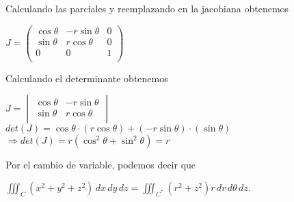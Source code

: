 \begin{center}
\end{center}Calculando las parciales y reemplazando en la jacobiana obtenemos\begin{center}
    $J = \begin{pmatrix}
        \cos\theta & -r\sin\theta & 0 \\
        \sin\theta & r\cos\theta & 0 \\
        0 & 0 & 1 \\
        \end{pmatrix}
    $
\end{center}Calculando el determinante obtenemos\begin{center}
    $J = 
        \begin{vmatrix}
        \cos\theta & -r\sin\theta \\
        \sin\theta & r\cos\theta \\
        \end{vmatrix}$\\
    \vspace{0.5cm}
    $det(J) = \cos\theta \cdot (r\cos\theta) + (-r\sin\theta) \cdot (\sin\theta)$\\
    \vspace{0.3cm}
    $\Rightarrow det(J) = r (\cos^2\theta + \sin^2\theta) = r$
\end{center}Por el cambio de variable, podemos decir que\begin{center}
    $\displaystyle\iiint_C (x^2 + y^2 + z^2) \, dx \, dy \, dz = \iiint_{C^*} (r^2 + z^2) r \, dr \, d\theta \, dz.$
\end{center}


